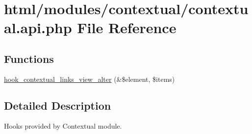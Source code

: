\hypertarget{contextual_8api_8php}{
\section{html/modules/contextual/contextual.api.php File Reference}
\label{contextual_8api_8php}
}
\subsection*{Functions}
\begin{DoxyCompactItemize}
\item 
\hyperlink{group__hooks_ga30ebdd98be1d239b608b769bda0ca9f0}{hook\_\-contextual\_\-links\_\-view\_\-alter} (\&\$element, \$items)
\end{DoxyCompactItemize}


\subsection{Detailed Description}
Hooks provided by Contextual module. 